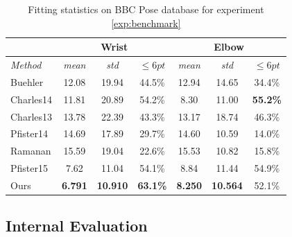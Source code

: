 \begin{table}[b!]
    \small
    \centering
    \begin{tabular}{|l|c|c|c||c|c|c|}
        \hline
                            & \multicolumn{3}{c||}{Wrist} & \multicolumn{3}{c|}{Elbow}\\
        \hline
        \emph{Method}       & \emph{mean} & \emph{std} & $\leq 6pt$ & \emph{mean} & \emph{std} & $\leq 6pt$\\
        \hline\hline
        Buehler             & 12.08    & 19.94        & 44.5\%       & 12.94    & 14.65        & 34.4\%\\
        Charles14           & 11.81    & 20.89        & 54.2\%       &  8.30    & 11.00        & \textbf{55.2\%}\\
        Charles13           & 13.78    & 22.39        & 43.3\%       & 13.17    & 18.74        & 46.3\%\\
        Pfister14           & 14.69    & 17.89        & 29.7\%       & 14.60    & 10.59        & 14.0\%\\
        Ramanan             & 15.59    & 19.04        & 22.6\%       & 15.53    & 10.82        & 15.8\%\\
        Pfister15           & 7.62     & 11.04        & 54.1\%       &  8.84    & 11.44        & 54.9\%\\
        \hline\hline
        Ours                & \textbf{6.791}& \textbf{10.910}   & \textbf{63.1\%}       & \textbf{8.250}     &  \textbf{10.564}        & 52.1\%\\
        \hline
    \end{tabular}
    \caption{Fitting statistics on BBC Pose database for experiment \ref{exp:benchmark}}
    \label{tab:hand_benchmark}
\end{table}


\subsection{Internal Evaluation}
\label{exp:internal}

